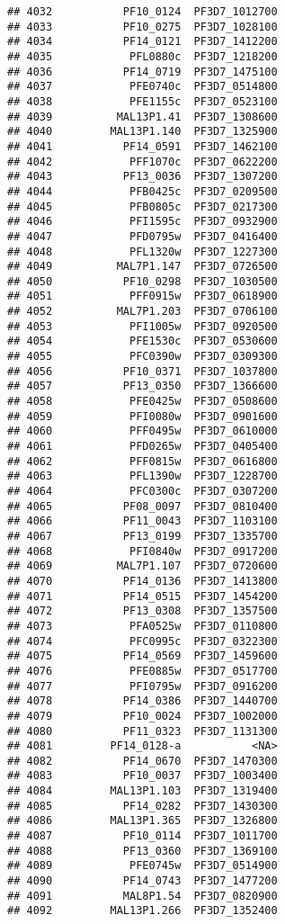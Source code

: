 \documentclass{article}\usepackage[]{graphicx}\usepackage[]{color}
\makeatletter
\newenvironment{kframe}{%
 \def\at@end@of@kframe{}%
 \ifinner\ifhmode%
  \def\at@end@of@kframe{\end{minipage}}%
  \begin{minipage}{\columnwidth}%
 \fi\fi%
 \def\FrameCommand##1{\hskip\@totalleftmargin \hskip-\fboxsep
 \colorbox{shadecolor}{##1}\hskip-\fboxsep
     \hskip-\linewidth \hskip-\@totalleftmargin \hskip\columnwidth}%
 \MakeFramed {\advance\hsize-\width
   \@totalleftmargin\z@ \linewidth\hsize
   \@setminipage}}%
 {\par\unskip\endMakeFramed%
 \at@end@of@kframe}
\newenvironment{knitrout}{}{} %
\makeatother
\begin{document}
\begin{knitrout}
\begin{kframe}
\begin{verbatim}
## 4032           PF10_0124  PF3D7_1012700
## 4033           PF10_0275  PF3D7_1028100
## 4034           PF14_0121  PF3D7_1412200
## 4035            PFL0880c  PF3D7_1218200
## 4036           PF14_0719  PF3D7_1475100
## 4037            PFE0740c  PF3D7_0514800
## 4038            PFE1155c  PF3D7_0523100
## 4039          MAL13P1.41  PF3D7_1308600
## 4040         MAL13P1.140  PF3D7_1325900
## 4041           PF14_0591  PF3D7_1462100
## 4042            PFF1070c  PF3D7_0622200
## 4043           PF13_0036  PF3D7_1307200
## 4044            PFB0425c  PF3D7_0209500
## 4045            PFB0805c  PF3D7_0217300
## 4046            PFI1595c  PF3D7_0932900
## 4047            PFD0795w  PF3D7_0416400
## 4048            PFL1320w  PF3D7_1227300
## 4049          MAL7P1.147  PF3D7_0726500
## 4050           PF10_0298  PF3D7_1030500
## 4051            PFF0915w  PF3D7_0618900
## 4052          MAL7P1.203  PF3D7_0706100
## 4053            PFI1005w  PF3D7_0920500
## 4054            PFE1530c  PF3D7_0530600
## 4055            PFC0390w  PF3D7_0309300
## 4056           PF10_0371  PF3D7_1037800
## 4057           PF13_0350  PF3D7_1366600
## 4058            PFE0425w  PF3D7_0508600
## 4059            PFI0080w  PF3D7_0901600
## 4060            PFF0495w  PF3D7_0610000
## 4061            PFD0265w  PF3D7_0405400
## 4062            PFF0815w  PF3D7_0616800
## 4063            PFL1390w  PF3D7_1228700
## 4064            PFC0300c  PF3D7_0307200
## 4065           PF08_0097  PF3D7_0810400
## 4066           PF11_0043  PF3D7_1103100
## 4067           PF13_0199  PF3D7_1335700
## 4068            PFI0840w  PF3D7_0917200
## 4069          MAL7P1.107  PF3D7_0720600
## 4070           PF14_0136  PF3D7_1413800
## 4071           PF14_0515  PF3D7_1454200
## 4072           PF13_0308  PF3D7_1357500
## 4073            PFA0525w  PF3D7_0110800
## 4074            PFC0995c  PF3D7_0322300
## 4075           PF14_0569  PF3D7_1459600
## 4076            PFE0885w  PF3D7_0517700
## 4077            PFI0795w  PF3D7_0916200
## 4078           PF14_0386  PF3D7_1440700
## 4079           PF10_0024  PF3D7_1002000
## 4080           PF11_0323  PF3D7_1131300
## 4081         PF14_0128-a           <NA>
## 4082           PF14_0670  PF3D7_1470300
## 4083           PF10_0037  PF3D7_1003400
## 4084         MAL13P1.103  PF3D7_1319400
## 4085           PF14_0282  PF3D7_1430300
## 4086         MAL13P1.365  PF3D7_1326800
## 4087           PF10_0114  PF3D7_1011700
## 4088           PF13_0360  PF3D7_1369100
## 4089            PFE0745w  PF3D7_0514900
## 4090           PF14_0743  PF3D7_1477200
## 4091           MAL8P1.54  PF3D7_0820900
## 4092         MAL13P1.266  PF3D7_1352400

\end{verbatim}
\end{kframe}
\end{knitrout}
\end{document}
